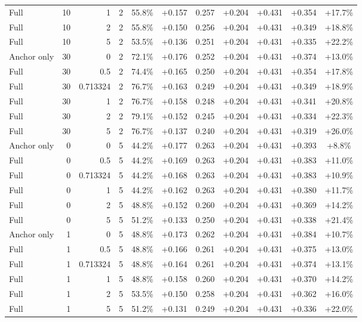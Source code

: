 \begin{table}[htbp]
\begin{tabular}{lrrrccccccc}
Full & 10 & 1 & 2 & 55.8\% & +0.157 & 0.257 & +0.204 & +0.431 & +0.354 & +17.7\% \\
Full & 10 & 2 & 2 & 55.8\% & +0.150 & 0.256 & +0.204 & +0.431 & +0.349 & +18.8\% \\
Full & 10 & 5 & 2 & 53.5\% & +0.136 & 0.251 & +0.204 & +0.431 & +0.335 & +22.2\% \\
Anchor only & 30 & 0 & 2 & 72.1\% & +0.176 & 0.252 & +0.204 & +0.431 & +0.374 & +13.0\% \\
Full & 30 & 0.5 & 2 & 74.4\% & +0.165 & 0.250 & +0.204 & +0.431 & +0.354 & +17.8\% \\
Full & 30 & 0.713324 & 2 & 76.7\% & +0.163 & 0.249 & +0.204 & +0.431 & +0.349 & +18.9\% \\
Full & 30 & 1 & 2 & 76.7\% & +0.158 & 0.248 & +0.204 & +0.431 & +0.341 & +20.8\% \\
Full & 30 & 2 & 2 & 79.1\% & +0.152 & 0.245 & +0.204 & +0.431 & +0.334 & +22.3\% \\
Full & 30 & 5 & 2 & 76.7\% & +0.137 & 0.240 & +0.204 & +0.431 & +0.319 & +26.0\% \\
Anchor only & 0 & 0 & 5 & 44.2\% & +0.177 & 0.263 & +0.204 & +0.431 & +0.393 & +8.8\% \\
Full & 0 & 0.5 & 5 & 44.2\% & +0.169 & 0.263 & +0.204 & +0.431 & +0.383 & +11.0\% \\
Full & 0 & 0.713324 & 5 & 44.2\% & +0.168 & 0.263 & +0.204 & +0.431 & +0.383 & +10.9\% \\
Full & 0 & 1 & 5 & 44.2\% & +0.162 & 0.263 & +0.204 & +0.431 & +0.380 & +11.7\% \\
Full & 0 & 2 & 5 & 48.8\% & +0.152 & 0.260 & +0.204 & +0.431 & +0.369 & +14.2\% \\
Full & 0 & 5 & 5 & 51.2\% & +0.133 & 0.250 & +0.204 & +0.431 & +0.338 & +21.4\% \\
Anchor only & 1 & 0 & 5 & 48.8\% & +0.173 & 0.262 & +0.204 & +0.431 & +0.384 & +10.7\% \\
Full & 1 & 0.5 & 5 & 48.8\% & +0.166 & 0.261 & +0.204 & +0.431 & +0.375 & +13.0\% \\
Full & 1 & 0.713324 & 5 & 48.8\% & +0.164 & 0.261 & +0.204 & +0.431 & +0.374 & +13.1\% \\
Full & 1 & 1 & 5 & 48.8\% & +0.158 & 0.260 & +0.204 & +0.431 & +0.370 & +14.2\% \\
Full & 1 & 2 & 5 & 53.5\% & +0.150 & 0.258 & +0.204 & +0.431 & +0.362 & +16.0\% \\
Full & 1 & 5 & 5 & 51.2\% & +0.131 & 0.249 & +0.204 & +0.431 & +0.336 & +22.0\% \\

\end{tabular}
\end{table}
